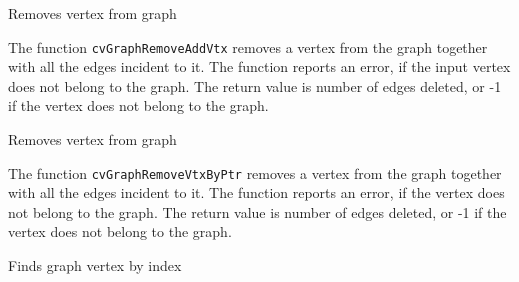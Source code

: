 \label{GraphRemoveVtx}

Removes vertex from graph


\begin{description}
\end{description}

The function \texttt{cvGraphRemoveAddVtx} removes a vertex from the graph
together with all the edges incident to it. The function reports an error,
if the input vertex does not belong to the graph. The return value is
number of edges deleted, or -1 if the vertex does not belong to the graph.

\label{GraphRemoveVtxByPtr}

Removes vertex from graph


\begin{description}
\end{description}


The function \texttt{cvGraphRemoveVtxByPtr} removes a vertex from the graph together with all the edges incident to it. The function reports an error, if the vertex does not belong to the graph. The return value is number of edges deleted, or -1 if the vertex does not belong to the graph.

\label{GetGraphVtx}

Finds graph vertex by index


\begin{description}
\end{description}



